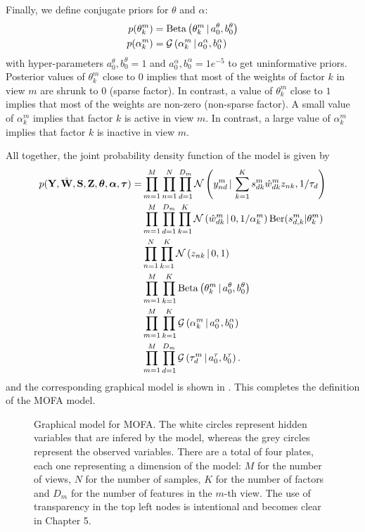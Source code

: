 Finally, we define conjugate priors for $\theta$ and $\alpha$:
\begin{align}
	p(\theta_k^m) &= \text{Beta}\left(\theta_k^m \,|\, a_0^\theta,b_0^\theta\right)\\
	p(\alpha_k^m) &= \mathcal{G}\left(\alpha_k^m \,|\, a_0^\alpha, b_0^\alpha\right)
\end{align}
with hyper-parameters $a_0^\theta,b_0^\theta =1$ and $a_0^\alpha, b_0^\alpha=1e^{-5}$ to get uninformative priors. Posterior values of $\theta_k^m$ close to $0$ implies that most of the weights of factor $k$ in view $m$ are shrunk to $0$ (sparse factor). In contrast, a value of $\theta_k^m$ close to $1$ implies that most of the weights are non-zero (non-sparse factor). A small value of $\alpha_k^m$ implies that factor $k$ is active in view $m$. In contrast, a large value of $\alpha_k^m$ implies that factor $k$ is inactive in view $m$.

All together, the joint probability density function of the model is given by
\begin{align}
	\begin{split}
	p({\bf Y},\hat{{\bf W}},{\bf S},{\bf Z},\mbox{\boldmath $\theta$}, \mbox{\boldmath $\alpha$}, \mbox{\boldmath $\tau$})  = &\prod_{m=1}^{M} \prod_{n=1}^{N} \prod_{d=1}^{D_m} \mathcal{N}\left(y_{nd}^m \,|\, \sum_{k=1}^{K} s_{dk}^m \hat{w}_{dk}^m z_{nk},1/\tau_d\right) \\
	& \prod_{m=1}^{M}\prod_{d=1}^{D_m} \prod_{k=1}^{K} \mathcal{N}\left(\hat{w}_{dk}^m \,|\, 0,1/\alpha_k^m\right) \text{Ber}(s_{d,k}^m|\theta_k^m) \\
	& \prod_{n=1}^{N} \prod_{k=1}^{K} \mathcal{N}\left(z_{nk} \,|\, 0,1\right) \\
	& \prod_{m=1}^{M} \prod_{k=1}^{K} \text{Beta}\left(\theta_k^m \,|\, a_0^\theta,b_0^\theta\right) \\
	& \prod_{m=1}^{M} \prod_{k=1}^{K} \mathcal{G}\left(\alpha_k^m \,|\, a_0^\alpha, b_0^\alpha\right) \\
	& \prod_{m=1}^{M} \prod_{d=1}^{D_m} \mathcal{G}\left(\tau_d^m \,|\, a_0^\tau,b_0^\tau\right).
	\label{likelihood}
	\end{split}
\end{align}
and the corresponding graphical model is shown in . This completes the definition of the MOFA model.

\begin{figure}[H]
	\centering
	
	\caption{Graphical model for MOFA. The white circles represent hidden variables that are infered by the model, whereas the grey circles represent the observed variables. There are a total of four plates, each one representing a dimension of the model: $M$ for the number of views, $N$ for the number of samples, $K$ for the number of factors and $D_m$ for the number of features in the $m$-th view. The use of transparency in the top left nodes is intentional and becomes clear in Chapter 5.}
	\label{fig:MOFA_graphical_model}
\end{figure}

